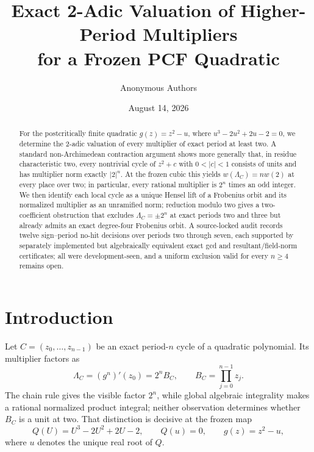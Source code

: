 \documentclass[11pt]{article}
\title{Exact 2-Adic Valuation of Higher-Period Multipliers\\
for a Frozen PCF Quadratic}
\author{Anonymous Authors}
\date{August 14, 2026}
\theoremstyle{definition}
\theoremstyle{remark}
\begin{document}
\maketitle

\begin{abstract}
For the postcritically finite quadratic
\(g(z)=z^2-u\), where \(u^3-2u^2+2u-2=0\), we determine the
2-adic valuation of every multiplier of exact period at least two.  A standard
non-Archimedean contraction argument shows more generally that, in residue
characteristic two, every nontrivial cycle of \(z^2+c\) with
\(0<|c|<1\) consists of units and has multiplier norm exactly \(|2|^n\).
At the frozen cubic this yields
\(w(\Lambda_C)=n w(2)\) at every place over two; in particular, every
rational multiplier is \(2^n\) times an odd integer.  We then identify each
local cycle as a unique Hensel lift of a Frobenius orbit and its normalized
multiplier as an unramified norm; reduction modulo two gives a two-coefficient
obstruction that excludes \(\Lambda_C=\pm2^n\) at exact periods two and
three but already admits an exact degree-four Frobenius orbit.  A
source-locked audit records twelve sign--period no-hit decisions over periods
two through seven, each supported by separately implemented but algebraically
equivalent exact gcd and resultant/field-norm certificates;
all were development-seen, and a uniform exclusion valid for every
\(n\ge4\) remains open.
\end{abstract}

\section{Introduction}
\label{sec:introduction}

Let \(C=(z_0,\ldots,z_{n-1})\) be an exact period-\(n\) cycle of a
quadratic polynomial.  Its multiplier factors as
\begin{equation}
  \Lambda_C=(g^n)'(z_0)=2^n B_C,
  \qquad B_C=\prod_{j=0}^{n-1}z_j.
  \label{eq:multiplier-factorization}
\end{equation}
The chain rule gives the visible factor \(2^n\), while global algebraic
integrality makes a rational normalized product integral; neither observation
determines whether \(B_C\) is a unit at two.
That distinction is decisive at the frozen map
\begin{equation}
  Q(U)=U^3-2U^2+2U-2,
  \qquad Q(u)=0,
  \qquad g(z)=z^2-u,
  \label{eq:frozen-map}
\end{equation}
where \(u\) denotes the unique real root of \(Q\).
\end{document}
